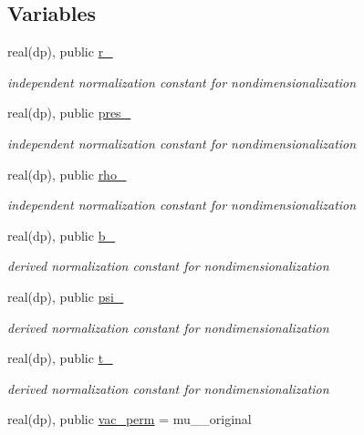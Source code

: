 \subsection*{Variables}
\begin{DoxyCompactItemize}
\item 
real(dp), public \hyperlink{namespaceeq__vars_a0c1f124ab3260a0f6937df9189a18184}{r\+\_}
\begin{DoxyCompactList}\small\item\em independent normalization constant for nondimensionalization \end{DoxyCompactList}\item 
real(dp), public \hyperlink{namespaceeq__vars_abce8bbe23c333a591a2ee5cef9512de9}{pres\+\_}
\begin{DoxyCompactList}\small\item\em independent normalization constant for nondimensionalization \end{DoxyCompactList}\item 
real(dp), public \hyperlink{namespaceeq__vars_a8c9bdb18a418329b9be241342ea704e3}{rho\+\_}
\begin{DoxyCompactList}\small\item\em independent normalization constant for nondimensionalization \end{DoxyCompactList}\item 
real(dp), public \hyperlink{namespaceeq__vars_acdd2464f2282359a818e4159b502e84b}{b\+\_}
\begin{DoxyCompactList}\small\item\em derived normalization constant for nondimensionalization \end{DoxyCompactList}\item 
real(dp), public \hyperlink{namespaceeq__vars_a2bb2594492faa83869c3eaf8cabe521e}{psi\+\_}
\begin{DoxyCompactList}\small\item\em derived normalization constant for nondimensionalization \end{DoxyCompactList}\item 
real(dp), public \hyperlink{namespaceeq__vars_a5170d0b84bb0faf24d5fdcf7c9371620}{t\+\_}
\begin{DoxyCompactList}\small\item\em derived normalization constant for nondimensionalization \end{DoxyCompactList}\item 
real(dp), public \hyperlink{namespaceeq__vars_ac45a3781896236d8c8fe95d920f7337c}{vac\+\_\+perm} = mu\+\_\+\_\+original

\end{DoxyCompactItemize}

